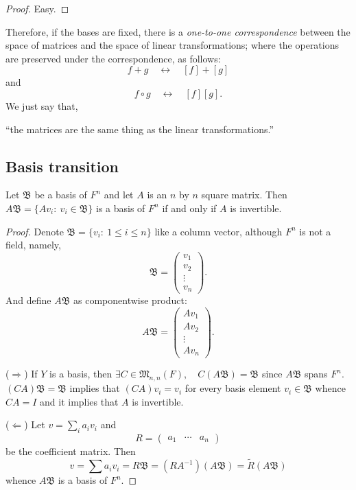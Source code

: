 \begin{proof}
Easy.
\end{proof}
Therefore, if the bases are fixed, there is a \textit{one-to-one correspondence} between the space of matrices and the space of linear transformations; where the operations are preserved under the correspondence, as follows: $$f+g \quad \longleftrightarrow \quad [f] + [g]$$ and $$f\circ g \quad \longleftrightarrow \quad [f][g].$$ We just say that, \begin{center}``the matrices are the same thing as the linear transformations.''\end{center}

\subsection{Basis transition}
\begin{theorem} Let $\mathfrak B$ be a basis of $F^n$ and let $A$ is an $n$ by $n$ square matrix. Then $A\mathfrak B = \{Av_i:~v_i\in\mathfrak B\}$ is a basis of $F^n$ if and only if $A$ is invertible.
\end{theorem}
\begin{proof}
Denote $\mathfrak B= \{v_i:~1\le i \le n\}$ like a column vector, although $F^n$ is not a field, namely, $$\mathfrak B = \begin{pmatrix} v_1\\ v_2 \\ \vdots \\ v_n \end{pmatrix}.$$ And define $A\mathfrak B$ as componentwise product: $$A\mathfrak B = \begin{pmatrix} Av_1\\ Av_2 \\ \vdots \\A v_n \end{pmatrix}.$$

($\Rightarrow$) If $Y$ is a basis, then $\exists C \in \mathfrak M_{n,n}(F),\quad C(A\mathfrak B) = \mathfrak B$ since $A\mathfrak B$ spans $F^n.$ $(CA)\mathfrak B = \mathfrak B$ implies that $(CA)v_i = v_i$ for every basis element $v_i \in \mathfrak B$ whence $CA = I$ and it implies that $A$ is invertible.

($\Leftarrow$) Let $v=\sum_i a_i v_i$ and $$R = \begin{pmatrix}a_1&\cdots&a_n\end{pmatrix}$$ be the coefficient matrix. Then $$v = \sum a_i v_i = R\mathfrak B = (R A^{-1})(A\mathfrak B) = \tilde R (A\mathfrak B)$$ whence $A\mathfrak B$ is a basis of $F^n$.
\end{proof}
